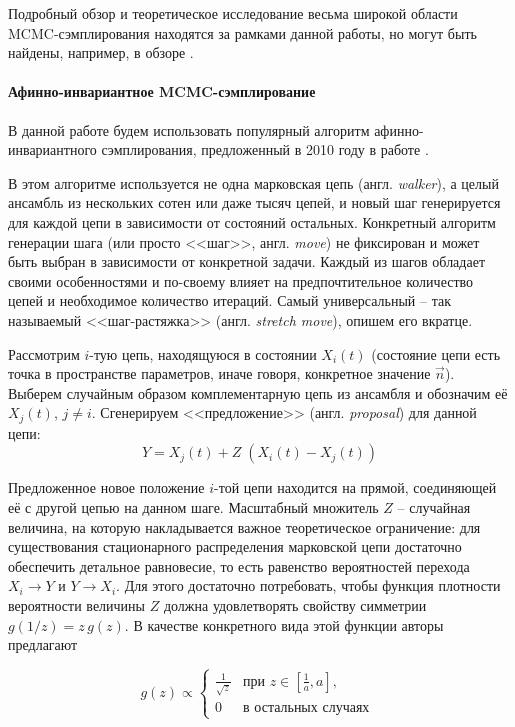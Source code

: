 \documentclass[12pt]{book}
\begin{document}
	Подробный обзор и теоретическое исследование весьма широкой области MCMC-сэмплирования находятся за рамками данной работы, но могут быть найдены, например, в обзоре \cite{Sharma2017}.

	\paragraph{Афинно-инвариантное MCMC-сэмплирование}
	
	В данной работе будем использовать популярный алгоритм афинно-инвариантного сэмплирования, предложенный в 2010 году в работе \cite{Goodman2010}.
	
	В этом алгоритме используется не одна марковская цепь (англ. \textit{walker}), а целый ансамбль из нескольких сотен или даже тысяч цепей, и новый шаг генерируется для каждой цепи в зависимости от состояний остальных. Конкретный алгоритм генерации шага (или просто <<шаг>>, англ. \textit{move}) не фиксирован и может быть выбран в зависимости от конкретной задачи. Каждый из шагов обладает своими особенностями и по-своему влияет на предпочтительное количество цепей и необходимое количество итераций. Самый универсальный -- так называемый <<шаг-растяжка>> (англ. \textit{stretch move}), опишем его вкратце.
	
	Рассмотрим $i$-тую цепь, находящуюся в состоянии $X_i(t)$ (состояние цепи есть точка в пространстве параметров, иначе говоря, конкретное значение $\vec{n}$). Выберем случайным образом комплементарную цепь из ансамбля и обозначим её $X_j(t)$, $j \neq i$. Сгенерируем <<предложение>> (англ. \textit{proposal}) для данной цепи:
	\begin{equation}
		\label{eq:gw2010-stretch-move}
		Y = X_j(t) + Z \; (X_i(t) - X_j(t))
	\end{equation}

	Предложенное новое положение $i$-той цепи находится на прямой, соединяющей её с другой цепью на данном шаге. Масштабный множитель $Z$ -- случайная величина, на которую накладывается важное теоретическое ограничение: для существования стационарного распределения марковской цепи достаточно обеспечить детальное равновесие, то есть равенство вероятностей перехода $X_i \rightarrow Y$ и $Y \rightarrow X_i$. Для этого достаточно потребовать, чтобы функция плотности вероятности величины $Z$ должна удовлетворять свойству симметрии $g(1 / z) = z \, g(z)$. В качестве конкретного вида этой функции авторы предлагают 
	
	\begin{equation}
		g(z) \propto \begin{cases}
			\frac{1}{\sqrt{z}}& \text{при } z \in \left[\frac{1}{a}, a\right], \\
			0& \text{в остальных случаях }
		\end{cases}
	\end{equation}
\end{document}
